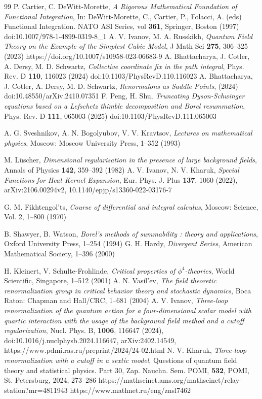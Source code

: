 \documentclass[a4paper]{article}
\begin{document}
\begin{thebibliography}{99}
P. Cartier, C. DeWitt-Morette, \textit{A Rigorous Mathematical Foundation of Functional Integration}, In: DeWitt-Morette, C., Cartier, P., Folacci, A. (eds) Functional Integration. NATO ASI Series, vol \textbf{361}, Springer, Boston (1997) doi:10.1007/978-1-4899-0319-8\_1
A. V. Ivanov, M. A. Russkikh, \textit{Quantum Field Theory on the Example of the Simplest Cubic Model}, J Math Sci \textbf{275}, 306--325 (2023) https://doi.org/10.1007/s10958-023-06683-9
A. Bhattacharya, J. Cotler, A. Dersy, M. D. Schwartz, \textit{Collective coordinate fix in the path integral}, Phys. Rev. D \textbf{110}, 116023 (2024) doi:10.1103/PhysRevD.110.116023
A. Bhattacharya, J. Cotler, A. Dersy, M. D. Schwartz, \textit{Renormalons as Saddle Points}, (2024) doi:10.48550/arXiv.2410.07351
F. Peng, H. Shu, \textit{Truncating Dyson-Schwinger equations based on a Lefschetz thimble decomposition and Borel resummation}, Phys. Rev. D \textbf{111}, 065003 (2025) doi:10.1103/PhysRevD.111.065003

A. G. Sveshnikov, A. N. Bogolyubov, V. V.  Kravtsov, \textit{Lectures on mathematical physics}, Moscow: Moscow University Press, 1--352 (1993)

M. Lüscher, \textit{Dimensional regularisation in the presence of large background fields}, Annals of Physics \textbf{142}, 359--392 (1982)
A. V. Ivanov, N. V. Kharuk, \textit{Special Functions for Heat Kernel Expansion}, Eur. Phys. J. Plus \textbf{137}, 1060 (2022), arXiv:2106.00294v2, 10.1140/epjp/s13360-022-03176-7

G. M. Fikhtengol'ts, \textit{Course of differential and integral calculus}, Moscow: Science, Vol. 2, 1--800 (1970)

B. Shawyer, B. Watson, \textit{Borel's methods of summability : theory and applications}, Oxford University Press, 1--254 (1994)
G. H. Hardy, \textit{Divergent Series}, American Mathematical Society, 1--396 (2000)

H. Kleinert, V. Schulte-Frohlinde, \textit{Critical properties of $\phi^4$-theories}, World Scientific, Singapore, 1--512 (2001)
A. N. Vasil'ev, \textit{The field theoretic renormalization group in critical behavior theory and stochastic dynamics}, Boca Raton: Chapman and Hall/CRC, 1--681 (2004)
A. V. Ivanov, \textit{Three-loop renormalization of the quantum action for a four-dimensional scalar model with quartic interaction with the usage of the background field method and a cutoff regularization}, Nucl. Phys. B, \textbf{1006}, 116647 (2024), doi:10.1016/j.nuclphysb.2024.116647, arXiv:2402.14549, https://www.pdmi.ras.ru/preprint/2024/24-02.html
N. V. Kharuk, \textit{Three-loop renormalization with a cutoff in a sextic model}, Questions of quantum field theory and statistical physics. Part 30, Zap. Nauchn. Sem. POMI, \textbf{532}, POMI, St. Petersburg, 2024, 273--286 https://mathscinet.ams.org/mathscinet/relay-station?mr=4811943
https://www.mathnet.ru/eng/znsl7462

\end{thebibliography}
\end{document}
